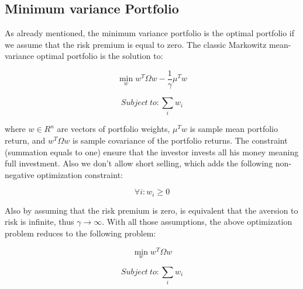 \documentclass[letterpaper,12pt]{article}
\begin{document}
\subsection{Minimum variance Portfolio}
As already mentioned, the minimum variance portfolio is the optimal portfolio if we assume that the risk premium is equal to zero. The classic Markowitz mean-variance optimal portfolio is the solution to:

$$\min\limits_{w} w^T\Omega w - \frac{1}{\gamma}\mu^T w$$

$$Subject\ to: \sum_{i} w_i$$


where $w \in R^n$ are vectors of portfolio weights, $\mu^T w$ is sample mean portfolio return, and $w^T\Omega w$ is sample covariance of the portfolio returns. The constraint (summation equals to one) ensure that the investor invests all his money meaning full investment. Also we don't allow short selling, which adds the following non-negative optimization constraint:

$$\forall i : w_i \geq 0$$

Also by assuming that the risk premium is zero, is equivalent that the aversion to risk is infinite, thus $\gamma \to \infty$. With all those assumptions, the above optimization problem reduces to the following problem:

$$\min\limits_{w} w^T\Omega w$$

$$Subject\ to: \sum_{i} w_i$$
\end{document}
